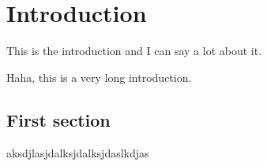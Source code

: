 \chapter{Introduction}

This is the introduction and I can say a lot about it.

Haha, this is a very long introduction.

\section{First section}

aksdjlasjdalksjdalksjdaslkdjas
